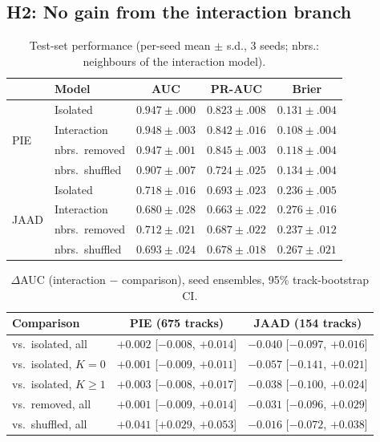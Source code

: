 \documentclass[conference]{IEEEtran}
\newcommand{\dauc}{$\Delta$AUC}
\begin{document}
\subsection{H2: No gain from the interaction branch}\label{sec:h2}

\begin{table}[t]
\centering
\caption{Test-set performance (per-seed mean $\pm$ s.d., 3 seeds; nbrs.: neighbours of the interaction model).}
\label{tab:main}
\footnotesize
\setlength{\tabcolsep}{3pt}
\begin{tabular}{@{}llccc@{}}
\toprule
 & Model & AUC & PR-AUC & Brier \\
\midrule
\multirow{4}{*}{PIE} & Isolated & $0.947\pm.000$ & $0.823\pm.008$ & $0.131\pm.004$ \\
 & Interaction & $0.948\pm.003$ & $0.842\pm.016$ & $0.108\pm.004$ \\
 & \quad nbrs.\ removed & $0.947\pm.001$ & $0.845\pm.003$ & $0.118\pm.004$ \\
 & \quad nbrs.\ shuffled & $0.907\pm.007$ & $0.724\pm.025$ & $0.134\pm.004$ \\
\midrule
\multirow{4}{*}{JAAD} & Isolated & $0.718\pm.016$ & $0.693\pm.023$ & $0.236\pm.005$ \\
 & Interaction & $0.680\pm.028$ & $0.663\pm.022$ & $0.276\pm.016$ \\
 & \quad nbrs.\ removed & $0.712\pm.021$ & $0.687\pm.022$ & $0.237\pm.012$ \\
 & \quad nbrs.\ shuffled & $0.693\pm.024$ & $0.678\pm.018$ & $0.267\pm.021$ \\
\bottomrule
\end{tabular}
\end{table}

\begin{table}[t]
\centering
\caption{\dauc{} (interaction $-$ comparison), seed ensembles, 95\% track-bootstrap CI.}
\label{tab:delta}
\footnotesize
\setlength{\tabcolsep}{3pt}
\begin{tabular}{@{}lcc@{}}
\toprule
Comparison & PIE (675 tracks) & JAAD (154 tracks) \\
\midrule
vs.\ isolated, all & $+0.002$ [$-0.008$, $+0.014$] & $-0.040$ [$-0.097$, $+0.016$] \\
vs.\ isolated, $K=0$ & $+0.001$ [$-0.009$, $+0.011$] & $-0.057$ [$-0.141$, $+0.021$] \\
vs.\ isolated, $K\ge1$ & $+0.003$ [$-0.008$, $+0.017$] & $-0.038$ [$-0.100$, $+0.024$] \\
vs.\ removed, all & $+0.001$ [$-0.009$, $+0.014$] & $-0.031$ [$-0.096$, $+0.029$] \\
vs.\ shuffled, all & $+0.041$ [$+0.029$, $+0.053$] & $-0.016$ [$-0.072$, $+0.038$] \\
\bottomrule
\end{tabular}
\end{table}
\end{document}
